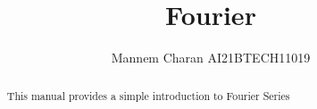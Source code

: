 \documentclass[journal,12pt,twocolumn]{IEEEtran}
\begin{document}
\let\StandardTheFigure\thefigure
\renewcommand{\thefigure}{\theproblem}



\def\putbox#1#2#3{\makebox[0in][l]{\makebox[#1][l]{}\raisebox{\baselineskip}[0in][0in]{\raisebox{#2}[0in][0in]{#3}}}}
     \def\rightbox#1{\makebox[0in][r]{#1}}
     \def\centbox#1{\makebox[0in]{#1}}
     \def\topbox#1{\raisebox{-\baselineskip}[0in][0in]{#1}}
     \def\midbox#1{\raisebox{-0.5\baselineskip}[0in][0in]{#1}}

\vspace{3cm}

\title{ 
Fourier 
}



\author{ Mannem Charan AI21BTECH11019 %
}
\maketitle


\tableofcontents


\renewcommand{\thefigure}{\theenumi}
\renewcommand{\thetable}{\theenumi}



\bigskip

\begin{abstract}
This manual provides a simple introduction to Fourier Series
\end{abstract}
\end{document}

